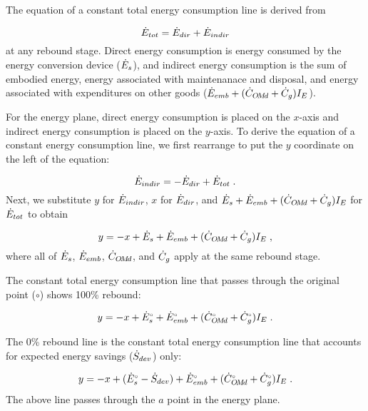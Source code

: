 The equation of a constant total energy consumption line is derived from 

\begin{equation}
  \dot{E}_{tot} = \dot{E}_{dir} + \dot{E}_{indir}
\end{equation}
%
at any rebound stage.
Direct energy consumption is energy consumed by the energy conversion device
($\dot{E}_s$), and 
indirect energy consumption is the sum of embodied energy, 
energy associated with maintenanace and disposal, and energy associated 
with expenditures on other goods
($\dot{E}_{emb} + (\dot{C}_{O\!M\!d} + \dot{C}_g) I_E$).

For the energy plane, 
direct energy consumption is placed on the $x$-axis and 
indirect energy consumption is placed on the $y$-axis.
To derive the equation of a constant energy consumption line, 
we first rearrange to put the $y$ coordinate on the left of the equation:

\begin{equation}
  \dot{E}_{indir} = - \dot{E}_{dir} + \dot{E}_{tot} \; .
\end{equation}
%
Next, we substitute $y$ for $\dot{E}_{indir}$,
$x$ for $\dot{E}_{dir}$, and 
$\dot{E}_s + \dot{E}_{emb} + (\dot{C}_{O\!M\!d} + \dot{C}_g) I_E$ for $\dot{E}_{tot}$
to obtain

\begin{equation}
  y = -x + \dot{E}_s + \dot{E}_{emb} + (\dot{C}_{O\!M\!d} + \dot{C}_g) I_E \; ,
\end{equation}
%
where all of $\dot{E}_s$, $\dot{E}_{emb}$, $\dot{C}_{O\!M\!d}$, and $\dot{C}_g$
apply at the same rebound stage.

The constant total energy consumption line 
that passes through the original point ($\circ$)
shows 100\% rebound:

\begin{equation}
  y = -x + {}{\dot{E}}^{\scriptscriptstyle \circ}_s + {}{\dot{E}}^{\scriptscriptstyle \circ}_{emb} + ({}{\dot{C}}^{\scriptscriptstyle \circ}_{O\!M\!d} + {}{\dot{C}}^{\scriptscriptstyle \circ}_g) I_E \; .
\end{equation}

The 0\% rebound line is the constant total energy consumption line 
that accounts for expected energy savings ($\dot{S}_{dev}$) only:

\begin{equation}
  y = -x + ({}{\dot{E}}^{\scriptscriptstyle \circ}_s - \dot{S}_{dev})
          + {}{\dot{E}}^{\scriptscriptstyle \circ}_{emb} + ({}{\dot{C}}^{\scriptscriptstyle \circ}_{O\!M\!d} + {}{\dot{C}}^{\scriptscriptstyle \circ}_g) I_E \; .
\end{equation}
%
The above line passes through the $a$ point in the energy plane.


